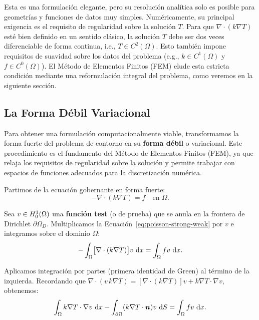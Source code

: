 Esta es una formulación elegante, pero su resolución analítica solo es posible para geometrías y funciones de datos muy simples. Numéricamente, su principal exigencia es el requisito de regularidad sobre la solución \(T\). Para que \(\nabla \cdot (k \nabla T)\) esté bien definido en un sentido clásico, la solución \(T\) debe ser dos veces diferenciable de forma continua, i.e., \(T \in C^2(\Omega)\). Esto también impone requisitos de suavidad sobre los datos del problema (e.g., \(k \in C^1(\Omega)\) y \(f \in C^0(\Omega)\)). El Método de Elementos Finitos (FEM) elude esta estricta condición mediante una reformulación integral del problema, como veremos en la siguiente sección.


\subsection{La Forma D\'ebil Variacional}
\label{subsec:poisson-weak-form}

Para obtener una formulaci\'on computacionalmente viable, transformamos la forma fuerte del problema de contorno en su \textbf{forma d\'ebil} o variacional. Este procedimiento es el fundamento del M\'etodo de Elementos Finitos (FEM), ya que relaja los requisitos de regularidad sobre la soluci\'on y permite trabajar con espacios de funciones adecuados para la discretizaci\'on num\'erica.

Partimos de la ecuaci\'on gobernante en forma fuerte:
\begin{equation}
    -\nabla \cdot (k \nabla T) = f \quad \text{en } \Omega.
    \label{eq:poisson-strong-weak}
\end{equation}

Sea $v \in H^1_0(\Omega)$ una \textbf{función test} (o de prueba) que se anula en la frontera de Dirichlet $\partial\Omega_D$. Multiplicamos la Ecuaci\'on~\eqref{eq:poisson-strong-weak} por $v$ e integramos sobre el dominio $\Omega$:
\begin{equation}
    -\int_\Omega \bigl[\nabla \cdot (k \nabla T)\bigr] v \, \mathop{}\!\mathrm{d} x = \int_\Omega f v \, \mathop{}\!\mathrm{d} x.
    \label{eq:weak-step1}
\end{equation}

Aplicamos integraci\'on por partes (primera identidad de Green) al t\'ermino de la izquierda. Recordando que $\nabla \cdot (v \, k \nabla T) = [\nabla \cdot (k \nabla T)] v + k \nabla T \cdot \nabla v$, obtenemos:
\begin{equation}
    \int_\Omega k \nabla T \cdot \nabla v \, \mathop{}\!\mathrm{d} x - \int_{\partial\Omega} (k \nabla T \cdot \bm{n}) v \, \mathop{}\!\mathrm{d} S = \int_\Omega f v \, \mathop{}\!\mathrm{d} x.
\end{equation}

